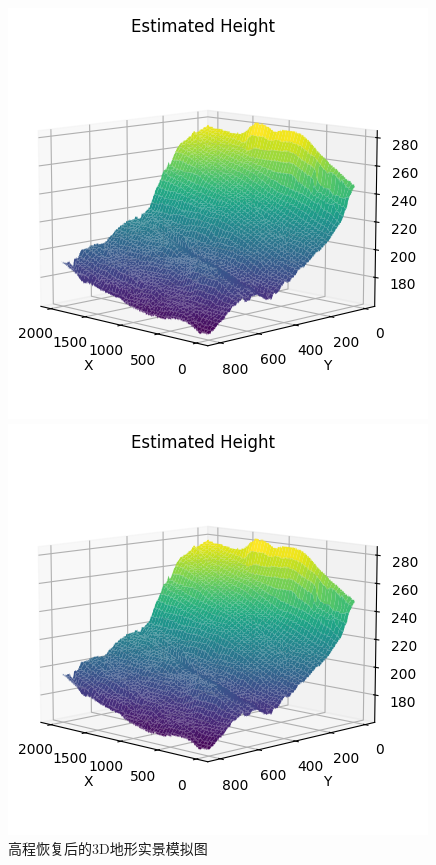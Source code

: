 \documentclass[a4paper]{article}
\begin{document}
\begin{figure}[H]
		\begin{minipage}[b]{0.4\textwidth}
			\centering
			\includegraphics[width=\linewidth]{images/t1/unwrap3d_4.png}
		\end{minipage}
		\hspace{0.05\textwidth}
		\begin{minipage}[b]{0.4\textwidth}
			\centering
			\includegraphics[width=\linewidth]{images/t1/unwrap3d_5.png}
		\end{minipage}

		\caption{高程恢复后的3D地形实景模拟图}
		\label{fig:unwrap3d}
	\end{figure}	
\end{document}
